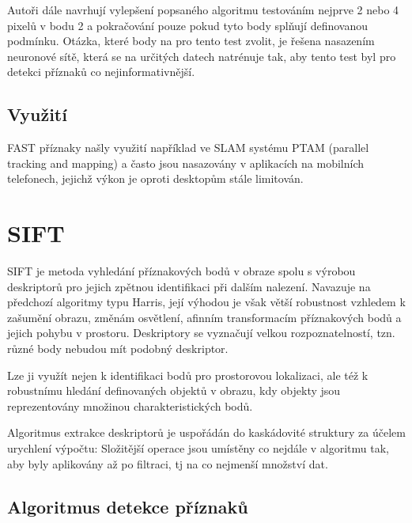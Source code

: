 		Autoři dále navrhují vylepšení popsaného algoritmu testováním nejprve 2 nebo 4 pixelů v bodu 2 a pokračování pouze pokud tyto body splňují definovanou podmínku. Otázka, které body na pro tento test zvolit, je řešena nasazením neuronové sítě, která se na určitých datech natrénuje tak, aby tento test byl pro detekci příznaků co nejinformativnější.
		
	\subsection{Využití}
	
		FAST příznaky našly využití například ve SLAM systému PTAM (parallel tracking and mapping) a často jsou nasazovány v aplikacích na mobilních telefonech, jejichž výkon je oproti desktopům stále limitován.	
	 

\section{SIFT}
\label{sec:sift}
	SIFT \cite{lowe2004distinctive} je metoda vyhledání příznakových bodů v obraze spolu s výrobou deskriptorů pro jejich zpětnou identifikaci při dalším nalezení. Navazuje na předchozí algoritmy typu Harris, její výhodou je však větší robustnost vzhledem k zašumění obrazu, změnám osvětlení, afinním transformacím příznakových bodů a jejich pohybu v prostoru. Deskriptory se vyznačují velkou rozpoznatelností, tzn. různé body nebudou mít podobný deskriptor.
	
	Lze ji využít nejen k identifikaci bodů pro prostorovou lokalizaci, ale též k robustnímu hledání definovaných objektů v obrazu, kdy objekty jsou reprezentovány množinou charakteristických bodů.
	
	Algoritmus extrakce deskriptorů je uspořádán do kaskádovité struktury  za účelem urychlení výpočtu: Složitější operace jsou umístěny co  nejdále v algoritmu tak, aby byly aplikovány až po filtraci, tj na co nejmenší množství dat.
	
	\subsection{Algoritmus detekce příznaků}
	
